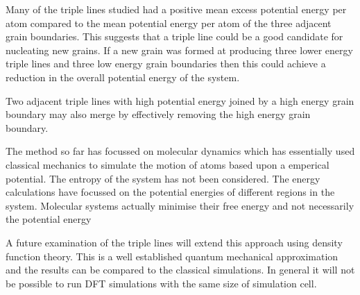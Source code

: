 \documentclass[12pt,a4paper]{book}
\begin{document}
Many of the triple lines studied had a positive mean excess potential energy per atom compared to the mean potential energy per atom of the three adjacent grain boundaries. This suggests that a triple line could be a good candidate for nucleating new grains. If a new grain was formed at producing three lower energy triple lines and three low energy grain boundaries then this could achieve a reduction in the overall potential energy of the system.

Two adjacent triple lines with high potential energy joined by a high energy grain boundary may also merge by effectively removing the high energy grain boundary. 


The method so far has focussed on molecular dynamics which has essentially used classical mechanics to simulate the motion of atoms based upon a emperical potential. The entropy of the system has not been considered. The energy calculations have focussed on the potential energies of different regions in the system. Molecular systems actually minimise their free energy and not necessarily the potential energy 

A future examination of the triple lines will extend this approach using density function theory. This is a well established quantum mechanical approximation and the results can be compared to the classical simulations. In general it will not be possible to run DFT simulations with the same size of simulation cell.  

 
\end{document}
